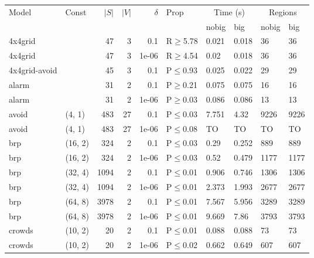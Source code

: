 \begin{longtable}{llrrrlllll}

        \toprule
        Model & Const & $|S|$ & $|V|$ & $\delta$ & Prop & \multicolumn{2}{c}{Time (s)} & \multicolumn{2}{c}{Regions} \\
        \cmidrule(ll){7-8} \cmidrule(ll){9-10}
        & & & & & & nobig & big & nobig & big \\
        \midrule
        
 4x4grid       &           &     	47 &   3 & 0.1   & R$\geq$5.78  & 0.021   & 0.018  & 36      & 36      \\
 4x4grid       &           &     	47 &   3 & 1e-06 & R$\geq$4.54  & 0.02    & 0.018  & 36      & 36      \\
 4x4grid-avoid &           &     	45 &   3 & 0.1   & P$\leq$0.93  & 0.025   & 0.022  & 29      & 29      \\
 alarm         &           &     	31 &   2 & 0.1   & P$\geq$0.21  & 0.075   & 0.075  & 16      & 16      \\
 alarm         &           &     	31 &   2 & 1e-06 & P$\geq$0.03  & 0.086   & 0.086  & 13      & 13      \\
 avoid         & (4, 1)    &    	483 &  27 & 0.1   & P$\leq$0.03  & 7.751   & 4.32   & 9226    & 9226    \\
 avoid         & (4, 1)    &    	483 &  27 & 1e-06 & P$\leq$0.08  & TO      & TO     & TO      & TO      \\
 brp           & (16, 2)   &    	324 &   2 & 0.1   & P$\leq$0.03  & 0.29    & 0.252  & 889     & 889     \\
 brp           & (16, 2)   &    	324 &   2 & 1e-06 & P$\leq$0.03  & 0.52    & 0.479  & 1177    & 1177    \\
 brp           & (32, 4)   &   	1094 &   2 & 0.1   & P$\leq$0.01  & 0.906   & 0.746  & 1306    & 1306    \\
 brp           & (32, 4)   &   	1094 &   2 & 1e-06 & P$\leq$0.01  & 2.373   & 1.993  & 2677    & 2677    \\
 brp           & (64, 8)   &   	3978 &   2 & 0.1   & P$\leq$0.01  & 7.567   & 5.956  & 3289    & 3289    \\
 brp           & (64, 8)   &   	3978 &   2 & 1e-06 & P$\leq$0.01  & 9.669   & 7.86   & 3793    & 3793    \\
 crowds        & (10, 2)   &     	20 &   2 & 0.1   & P$\leq$0.01  & 0.088   & 0.088  & 73      & 73      \\
 crowds        & (10, 2)   &     	20 &   2 & 1e-06 & P$\leq$0.02  & 0.662   & 0.649  & 607     & 607     \\

\end{longtable}
